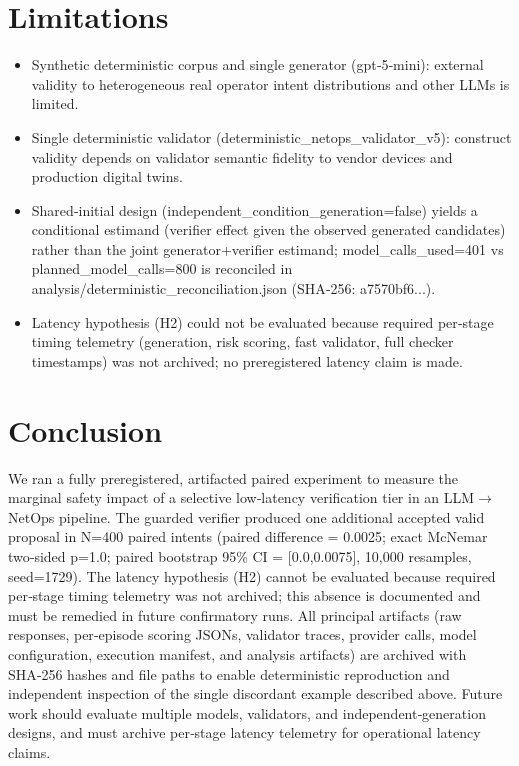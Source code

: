 \documentclass[conference]{IEEEtran}
\begin{document}
\section{Limitations}
\begin{itemize}
\item Synthetic deterministic corpus and single generator (gpt‑5‑mini): external validity to heterogeneous real operator intent distributions and other LLMs is limited.
\item Single deterministic validator (deterministic\_netops\_validator\_v5): construct validity depends on validator semantic fidelity to vendor devices and production digital twins.
\item Shared‑initial design (independent\_condition\_generation=false) yields a conditional estimand (verifier effect given the observed generated candidates) rather than the joint generator+verifier estimand; model\_calls\_used=401 vs planned\_model\_calls=800 is reconciled in analysis/deterministic\_reconciliation.json (SHA‑256: a7570bf6...).
\item Latency hypothesis (H2) could not be evaluated because required per‑stage timing telemetry (generation, risk scoring, fast validator, full checker timestamps) was not archived; no preregistered latency claim is made.
\end{itemize}

\section{Conclusion}
We ran a fully preregistered, artifacted paired experiment to measure the marginal safety impact of a selective low‑latency verification tier in an LLM\ensuremath{\rightarrow}NetOps pipeline. The guarded verifier produced one additional accepted valid proposal in N=400 paired intents (paired difference = 0.0025; exact McNemar two‑sided p=1.0; paired bootstrap 95\% CI = [0.0,0.0075], 10,000 resamples, seed=1729). The latency hypothesis (H2) cannot be evaluated because required per‑stage timing telemetry was not archived; this absence is documented and must be remedied in future confirmatory runs. All principal artifacts (raw responses, per‑episode scoring JSONs, validator traces, provider calls, model configuration, execution manifest, and analysis artifacts) are archived with SHA‑256 hashes and file paths to enable deterministic reproduction and independent inspection of the single discordant example described above. Future work should evaluate multiple models, validators, and independent‑generation designs, and must archive per‑stage latency telemetry for operational latency claims.
\end{document}
